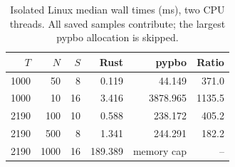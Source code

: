 \begin{table}[tbp]
\centering\small
\setlength{\tabcolsep}{4pt}
\caption{Isolated Linux median wall times (ms), two CPU threads. All saved samples contribute; the largest pypbo allocation is skipped.}\label{tab:benchmark}
\begin{tabular}{rrrrrr}
\toprule
$T$ & $N$ & $S$ & Rust & pypbo & Ratio \\
\midrule
1000 & 50 & 8 & 0.119 & 44.149 & 371.0 \\
1000 & 10 & 16 & 3.416 & 3878.965 & 1135.5 \\
2190 & 100 & 10 & 0.588 & 238.172 & 405.2 \\
2190 & 500 & 8 & 1.341 & 244.291 & 182.2 \\
2190 & 1000 & 16 & 189.389 & memory cap & -- \\
\bottomrule
\end{tabular}
\end{table}
